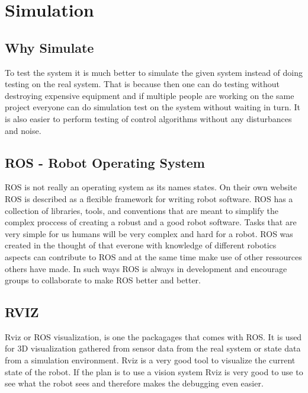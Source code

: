 




\section*{Simulation}
\subsection*{Why Simulate}
To test the system it is much better to simulate the given system instead of doing testing on the real system. That is because then one can do testing without destroying expensive equipment and if multiple people are working on the same project everyone can do simulation test on the system without waiting in turn. It is also easier to perform testing of control algorithms without any disturbances and noise. 

\subsection*{ROS - Robot Operating System}
ROS is not really an operating system as its names states. On their own website ROS is described as a flexible framework for writing robot software. ROS has a collection of libraries, tools, and conventions that are meant to simplify the complex proccess of creating a robust and a good robot software. Tasks that are very simple for us humans will be very complex and hard for a robot. ROS was created in the thought of that everone with knowledge of different robotics aspects can contribute to ROS and at the same time make use of other ressources others have made. In such ways ROS is always in development and encourage groups to collaborate to make ROS better and better. 


\subsection*{RVIZ}
Rviz or ROS visualization, is one the packagages that comes with ROS. It is used for 3D visualization gathered from sensor data from the real system or state data from a simulation environment. Rviz is a very good tool to visualize the current state of the robot. If the plan is to use a vision system Rviz is very good to use to see what the robot sees and therefore makes the debugging even easier. 





